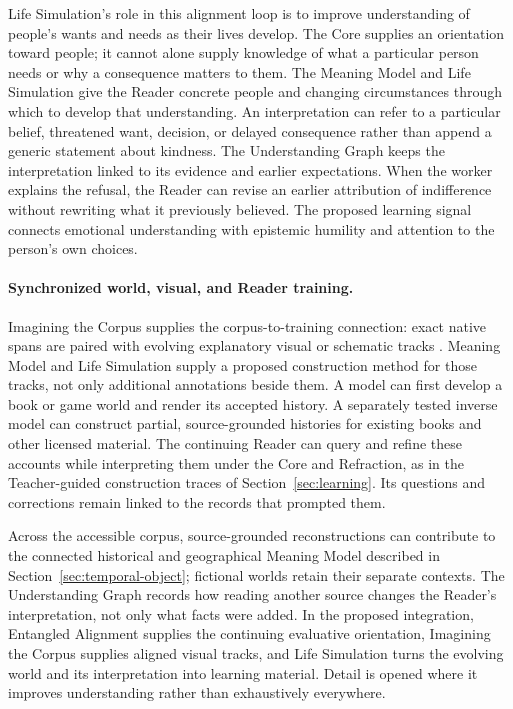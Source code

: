 \documentclass[10pt]{article}
\begin{document}
Life Simulation's role in this alignment loop is to improve understanding of
people's wants and needs as their lives develop. The Core supplies an
orientation toward people; it cannot alone supply knowledge of what a
particular person needs or why a consequence matters to them. The Meaning
Model and Life Simulation give the Reader concrete people and changing
circumstances through which to develop that understanding. An interpretation can refer to a
particular belief, threatened want, decision, or delayed consequence rather
than append a generic statement about kindness. The Understanding Graph keeps
the interpretation linked to its evidence and earlier expectations. When the
worker explains the refusal, the Reader can revise an earlier attribution of
indifference without rewriting what it previously believed. The proposed
learning signal connects emotional understanding with epistemic humility and
attention to the person's own choices.

\paragraph{Synchronized world, visual, and Reader training.}
Imagining the Corpus supplies the corpus-to-training connection: exact native
spans are paired with evolving explanatory visual or schematic tracks
\cite{westerbergImagining2026}. Meaning Model and Life Simulation supply a
proposed construction method for those tracks, not only additional annotations
beside them. A model can first develop a book or game world and render its
accepted history. A separately tested inverse model can construct partial,
source-grounded histories for existing books and other licensed material.
The continuing Reader can query and refine these accounts while interpreting
them under the Core and Refraction, as in the Teacher-guided construction
traces of Section~\ref{sec:learning}. Its questions and corrections remain
linked to the records that prompted them.

Across the
accessible corpus, source-grounded reconstructions can contribute to the
connected historical and geographical Meaning Model described in
Section~\ref{sec:temporal-object}; fictional worlds retain their separate
contexts. The Understanding Graph records how reading another source changes
the Reader's interpretation, not only what facts were added. In the proposed
integration, Entangled Alignment supplies the continuing evaluative orientation, Imagining the
Corpus supplies aligned visual tracks, and Life Simulation turns the evolving
world and its interpretation into learning material. Detail is opened where
it improves understanding rather than exhaustively everywhere.
\end{document}
